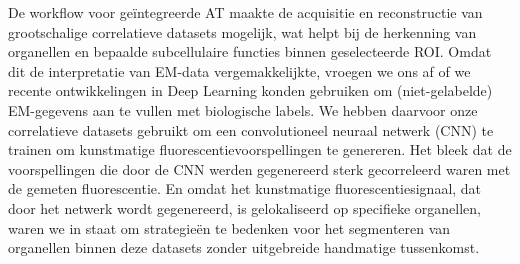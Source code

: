 De workflow voor geïntegreerde AT maakte de acquisitie en reconstructie van grootschalige correlatieve datasets mogelijk, wat helpt bij de herkenning van organellen en bepaalde subcellulaire functies binnen geselecteerde ROI. Omdat dit de interpretatie van EM-data vergemakkelijkte, vroegen we ons af of we recente ontwikkelingen in Deep Learning konden gebruiken om (niet-gelabelde) EM-gegevens aan te vullen met biologische labels. We hebben daarvoor onze correlatieve datasets gebruikt om een convolutioneel neuraal netwerk (CNN) te trainen om kunstmatige fluorescentievoorspellingen te genereren. Het bleek dat de voorspellingen die door de CNN werden gegenereerd sterk gecorreleerd waren met de gemeten fluorescentie. En omdat het kunstmatige fluorescentiesignaal, dat door het netwerk wordt gegenereerd, is gelokaliseerd op specifieke organellen, waren we in staat om strategieën te bedenken voor het segmenteren van organellen binnen deze datasets zonder uitgebreide handmatige tussenkomst.
